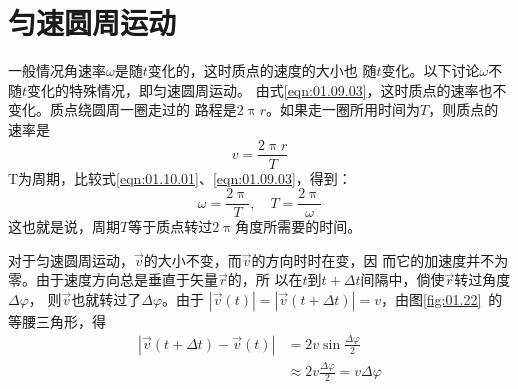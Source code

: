 \section{匀速圆周运动}\label{sec:01.10}

一般情况角速率$\omega$是随$t$变化的，这时质点的速度的大小也
随$t$变化。以下讨论$\omega$不随$t$变化的特殊情况，即匀速圆周运动。
由式\eqref{eqn:01.09.03}，这时质点的速率也不变化。质点绕圆周一圈走过的
路程是$2\uppi r$。如果走一圈所用时间为$T$，则质点的速率是
\begin{equation}\label{eqn:01.10.01}
  v=\frac{2 \uppi r}{T}
\end{equation}
T为周期，比较式\eqref{eqn:01.10.01}、\eqref{eqn:01.09.03}，得到：
\begin{equation}\label{eqn:01.10.02}
  \omega=\frac{2 \uppi}{T}, \quad T=\frac{2 \uppi}{\omega}
\end{equation}
这也就是说，周期$T$等于质点转过$2\uppi$角度所需要的时间。

对于匀速圆周运动，$\vec{v}$的大小不变，而$\vec{v}$的方向时时在变，因
而它的加速度并不为零。由于速度方向总是垂直于矢量$\vec{r}$的，所
以在$t$到$t+\Delta t$间隔中，倘使$\vec{r}$转过角度$\Delta\varphi$，
则$\vec{v}$也就转过了$\Delta\varphi$。由于
$|\vec{v}\left(t\right)|=|\vec{v}\left(t+\Delta t\right)|=v$，由图\ref{fig:01.22}~的等腰三角形，得
\begin{equation*}
  \begin{aligned}
    |\vec{v}\left(t+\Delta t\right)-\vec{v}\left(t\right)| & =2 v \sin \frac{\Delta \varphi}{2}                   \\
                                                           & \approx 2 v\frac{\Delta \varphi}{2}=v \Delta \varphi
  \end{aligned}
\end{equation*}

